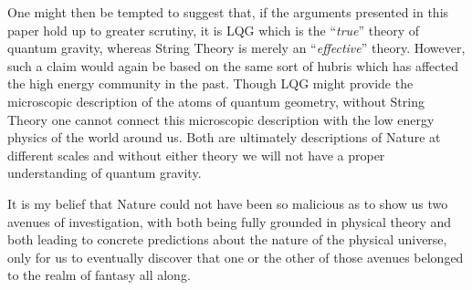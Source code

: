 \documentclass[submission, Phys]{SciPost}
\begin{document}
One might then be tempted to suggest that, if the arguments presented in this paper hold up to greater scrutiny, it is LQG which is the ``\emph{true}'' theory of quantum gravity, whereas String Theory is merely an ``\emph{effective}'' theory. However, such a claim would again be based on the same sort of hubris which has affected the high energy community in the past. Though LQG might provide the microscopic description of the atoms of quantum geometry, without String Theory one cannot connect this microscopic description with the low energy physics of the world around us. Both are ultimately descriptions of Nature at different scales and without either theory we will not have a proper understanding of quantum gravity.


It is my belief that Nature could not have been so malicious as to show us two avenues of investigation, with both being fully grounded in physical theory and both leading to concrete predictions about the nature of the physical universe, only for us to eventually discover that one or the other of those avenues belonged to the realm of fantasy all along.
\end{document}
